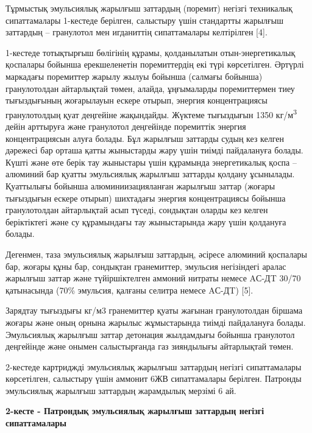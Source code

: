 Тұрмыстық эмульсиялық жарылғыш заттардың (поремит) негізгі техникалық
сипаттамалары 1-кестеде берілген, салыстыру үшін стандартты жарылғыш
заттардың -- гранулотол мен игданиттің сипаттамалары келтірілген
{[}4{]}.

1-кестеде тотықтырғыш бөлігінің құрамы, қолданылатын отын-энергетикалық
қоспалары бойынша ерекшеленетін поремиттердің екі түрі көрсетілген.
Әртүрлі маркадағы поремиттер жарылу жылуы бойынша (салмағы бойынша)
гранулотолдан айтарлықтай төмен, алайда, ұңғымаларды поремиттермен тиеу
тығыздығының жоғарылауын ескере отырып, энергия концентрациясы
гранулотолдың қуат деңгейіне жақындайды. Жүктеме тығыздығын 1350
кг/м\textsuperscript{3} дейін арттыруға және гранулотол деңгейінде
поремиттік энергия концентрациясын алуға болады. Бұл жарылғыш заттарды
судың кез келген дәрежесі бар орташа қатты жыныстарды жару үшін тиімді
пайдалануға болады. Күшті және өте берік тау жыныстары үшін құрамында
энергетикалық қоспа -- алюминий бар қуатты эмульсиялық жарылғыш заттарды
қолдану ұсынылады. Қуаттылығы бойынша алюминиизацияланған жарылғыш
заттар (жоғары тығыздығын ескере отырып) шихтадағы энергия
концентрациясы бойынша гранулотолдан айтарлықтай асып түседі, сондықтан
оларды кез келген беріктіктегі және су құрамындағы тау жыныстарында жару
үшін қолдануға болады.

Дегенмен, таза эмульсиялық жарылғыш заттардың, әсіресе алюминий
қоспалары бар, жоғары құны бар, сондықтан гранемиттер, эмульсия
негізіндегі аралас жарылғыш заттар және түйіршіктелген аммоний нитраты
немесе AС-ДT 30/70 қатынасында (70\% эмульсия, қалғаны селитра немесе
AС-ДT) {[}5{]}.

Зарядтау тығыздығы кг/м3 гранемиттер қуаты жағынан гранулотолдан біршама
жоғары және оның орнына жарылыс жұмыстарында тиімді пайдалануға болады.
Эмульсиялық жарылғыш заттар детонация жылдамдығы бойынша гранулотол
деңгейінде және онымен салыстырғанда газ зияндылығы айтарлықтай төмен.

2-кестеде картриджді эмульсиялық жарылғыш заттардың негізгі
сипаттамалары көрсетілген, салыстыру үшін аммонит 6ЖВ сипаттамалары
берілген. Патронды эмульсиялық жарылғыш заттардың жарамдылық мерзімі 6
ай.

{\bfseries 2-кесте - Патрондық эмульсиялық жарылғыш заттардың негізгі
сипаттамалары}

